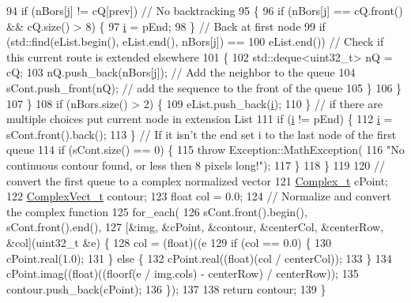 \begin{DoxyCode}
94       \textcolor{keywordflow}{if} (nBors[\hyperlink{_comparision_pictures_2_createtest_image_8m_ac86694252f8dfdb19aaeadc4b7c342c6}{j}] != cQ[prev]) \textcolor{comment}{// No backtracking}
95       \{
96         \textcolor{keywordflow}{if} (nBors[\hyperlink{_comparision_pictures_2_createtest_image_8m_ac86694252f8dfdb19aaeadc4b7c342c6}{j}] == cQ.front() && cQ.size() > 8) \{
97           \hyperlink{_comparision_pictures_2_createtest_image_8m_a6f6ccfcf58b31cb6412107d9d5281426}{i} = pEnd;
98         \} \textcolor{comment}{// Back at first node}
99         \textcolor{keywordflow}{if} (std::find(eList.begin(), eList.end(), nBors[\hyperlink{_comparision_pictures_2_createtest_image_8m_ac86694252f8dfdb19aaeadc4b7c342c6}{j}]) ==
100             eList.end()) \textcolor{comment}{// Check if this current route is extended elsewhere}
101         \{
102           std::deque<uint32\_t> nQ = cQ;
103           nQ.push\_back(nBors[\hyperlink{_comparision_pictures_2_createtest_image_8m_ac86694252f8dfdb19aaeadc4b7c342c6}{j}]); \textcolor{comment}{// Add the neighbor to the queue}
104           sCont.push\_front(nQ);   \textcolor{comment}{// add the sequence to the front of the queue}
105         \}
106       \}
107     \}
108     \textcolor{keywordflow}{if} (nBors.size() > 2) \{
109       eList.push\_back(\hyperlink{_comparision_pictures_2_createtest_image_8m_a6f6ccfcf58b31cb6412107d9d5281426}{i});
110     \} \textcolor{comment}{// if there are multiple choices put current node in extension List}
111     \textcolor{keywordflow}{if} (\hyperlink{_comparision_pictures_2_createtest_image_8m_a6f6ccfcf58b31cb6412107d9d5281426}{i} != pEnd) \{
112       \hyperlink{_comparision_pictures_2_createtest_image_8m_a6f6ccfcf58b31cb6412107d9d5281426}{i} = sCont.front().back();
113     \} \textcolor{comment}{// If it isn't the end set i to the last node of the first queue}
114     \textcolor{keywordflow}{if} (sCont.size() == 0) \{
115       \textcolor{keywordflow}{throw} Exception::MathException(
116           \textcolor{stringliteral}{"No continuous contour found, or less then 8 pixels long!"});
117     \}
118   \}
119 
120   \textcolor{comment}{// convert the first queue to a complex normalized vector}
121   \hyperlink{_soil_math_types_8h_a26c307796ad803485b0376c90026d8f7}{Complex\_t} cPoint;
122   \hyperlink{_soil_math_types_8h_a7567e521c2b2c408dcb62dbff72390f7}{ComplexVect\_t} contour;
123   \textcolor{keywordtype}{float} col = 0.0;
124   \textcolor{comment}{// Normalize and convert the complex function}
125   for\_each(
126       sCont.front().begin(), sCont.front().end(),
127       [&img, &cPoint, &contour, &centerCol, &centerRow, &col](uint32\_t &e) \{
128         col = (float)((e %
129         \textcolor{keywordflow}{if} (col == 0.0) \{
130           cPoint.real(1.0);
131         \} \textcolor{keywordflow}{else} \{
132           cPoint.real((\textcolor{keywordtype}{float})(col / centerCol));
133         \}
134         cPoint.imag((\textcolor{keywordtype}{float})((floorf(e / img.cols) - centerRow) / centerRow));
135         contour.push\_back(cPoint);
136       \});
137 
138   \textcolor{keywordflow}{return} contour;
139 \}
\end{DoxyCode}


